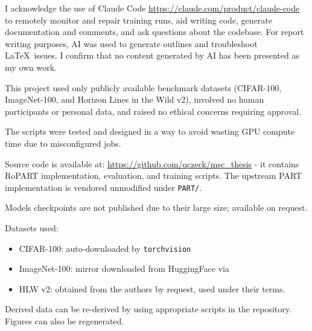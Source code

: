 \documentclass[final_report.tex]{subfiles}
\begin{document}
\label{ch:declarations}
\renewcommand{\chaptertitle}{Declarations}

I acknowledge the use of Claude Code \url{https://claude.com/product/claude-code} to remotely monitor and repair training runs, aid writing code, generate documentation and comments, and ask questions about the codebase. For report writing purposes, AI was used to generate outlines and troubleshoot \LaTeX\ issues. I confirm that no content generated by AI has been presented as my own work.

This project used only publicly available benchmark datasets (CIFAR-100, ImageNet-100, and Horizon Lines in the Wild v2), involved no human participants or personal data, and raised no ethical concerns requiring approval.

The scripts were tested and designed in a way to avoid wasting GPU compute time due to misconfigured jobs.

Source code is available at: \url{https://github.com/qczeck/msc_thesis} - it contains RoPART implementation, evaluation, and training scripts. The upstream PART~\cite{part} implementation is vendored unmodified under \texttt{PART/}.

Models checkpoints are not published due to their large size; available on request. 

Datasets used:
\begin{itemize}
\item CIFAR-100: auto-downloaded by \texttt{torchvision}
\item ImageNet-100: mirror downloaded from HuggingFace via 
\item HLW v2: obtained from the authors by request, used under their terms.
\end{itemize}
Derived data can be re-derived by using appropriate scripts in the repository. Figures can also be regenerated.
\end{document}
